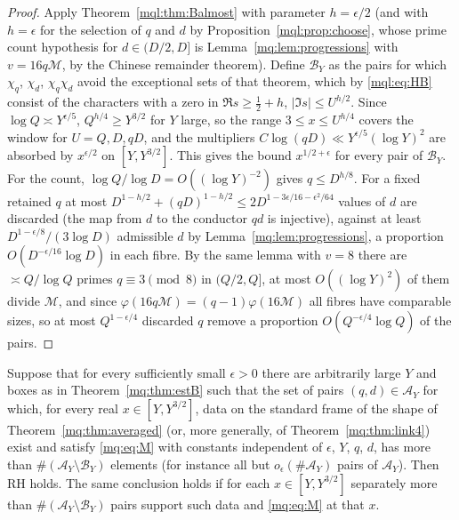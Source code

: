 \begin{proof}
Apply Theorem~\ref{mql:thm:Balmost} with parameter $h=\epsilon/2$ (and with $h=\epsilon$ for the selection of $q$ and $d$ by Proposition~\ref{mql:prop:choose}, whose prime count hypothesis for $d\in(D/2,D]$ is Lemma~\ref{mq:lem:progressions} with $v=16q\mathcal M$, by the Chinese remainder theorem). Define $\mathcal B_Y$ as the pairs for which $\chi_q$, $\chi_d$, $\chi_q\chi_d$ avoid the exceptional sets of that theorem, which by \eqref{mql:eq:HB} consist of the characters with a zero in $\Re s\ge\frac12+h$, $|\Im s|\le U^{h/2}$. Since $\log Q\asymp Y^{\epsilon/5}$, $Q^{h/4}\ge Y^{3/2}$ for $Y$ large, so the range $3\le x\le U^{h/4}$ covers the window for $U=Q,D,qD$, and the multipliers $C\log(qD)\ll Y^{\epsilon/5}(\log Y)^2$ are absorbed by $x^{\epsilon/2}$ on $[Y,Y^{3/2}]$. This gives the bound $x^{1/2+\epsilon}$ for every pair of $\mathcal B_Y$. For the count, $\log Q/\log D=O((\log Y)^{-2})$ gives $q\le D^{h/8}$. For a fixed retained $q$ at most $D^{1-h/2}+(qD)^{1-h/2}\le2D^{1-3\epsilon/16-\epsilon^2/64}$ values of $d$ are discarded (the map from $d$ to the conductor $qd$ is injective), against at least $D^{1-\epsilon/8}/(3\log D)$ admissible $d$ by Lemma~\ref{mq:lem:progressions}, a proportion $O(D^{-\epsilon/16}\log D)$ in each fibre. By the same lemma with $v=8$ there are $\asymp Q/\log Q$ primes $q\equiv3\pmod8$ in $(Q/2,Q]$, at most $O((\log Y)^2)$ of them divide $\mathcal M$, and since $\varphi(16q\mathcal M)=(q-1)\varphi(16\mathcal M)$ all fibres have comparable sizes, so at most $Q^{1-\epsilon/4}$ discarded $q$ remove a proportion $O(Q^{-\epsilon/4}\log Q)$ of the pairs.
\end{proof}

\begin{theorem}\label{mq:thm:chainM}
Suppose that for every sufficiently small $\epsilon>0$ there are arbitrarily large $Y$ and boxes as in Theorem~\ref{mq:thm:estB} such that the set of pairs $(q,d)\in\mathcal A_Y$ for which, for every real $x\in[Y,Y^{3/2}]$, data on the standard frame of the shape of Theorem~\ref{mq:thm:averaged} (or, more generally, of Theorem~\ref{mq:thm:link4}) exist and satisfy \eqref{mq:eq:M} with constants independent of $\epsilon$, $Y$, $q$, $d$, has more than $\#(\mathcal A_Y\setminus\mathcal B_Y)$ elements (for instance all but $o_\epsilon(\#\mathcal A_Y)$ pairs of $\mathcal A_Y$). Then RH holds. The same conclusion holds if for each $x\in[Y,Y^{3/2}]$ separately more than $\#(\mathcal A_Y\setminus\mathcal B_Y)$ pairs support such data and \eqref{mq:eq:M} at that $x$.
\end{theorem}

